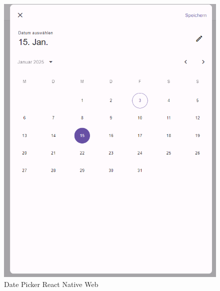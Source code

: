 \begin{figure}[H]
    \hfill
    \begin{minipage}{0.45\textwidth}
        \centering
        \includegraphics[width=\linewidth]{images/form/web/react_native/dateOpen.png}
        \caption{Date Picker React Native Web}
    \end{minipage}

    \vspace{0.5cm}


\end{figure}
